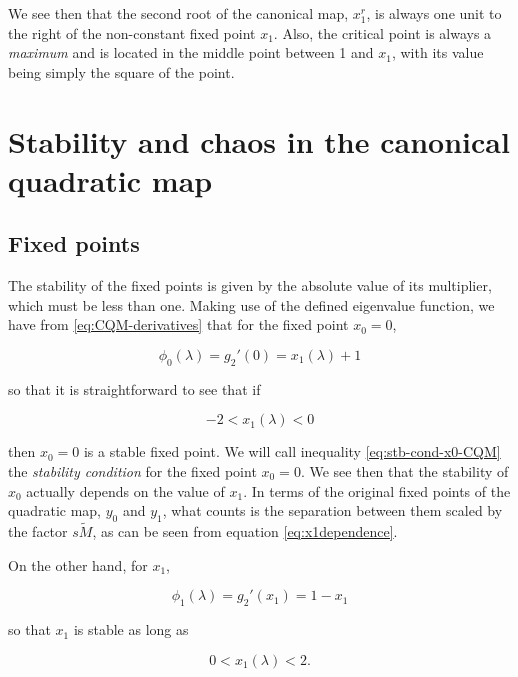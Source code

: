 \documentclass[10pt,twoside,titlepage]{book}
\numberwithin{equation}{chapter}
\numberwithin{figure}{chapter}
\numberwithin{table}{chapter}
\theoremstyle{plain}%
\theoremstyle{definition}
\theoremstyle{remark}
\begin{document}
We see then that the second root of the canonical map, $x_1^r$, is always one unit to the right of the non-constant fixed point $x_1$. Also, the critical point is always a \emph{maximum} and is located in the middle point between 1 and $x_1$, with its value being simply the square of the point.

\section{Stability and chaos in the canonical quadratic map}
\subsection{Fixed points}

The stability of the fixed points is given by the absolute value of its multiplier, which must be less than one. Making use of the defined eigenvalue function, we have from \eqref{eq:CQM-derivatives} that for the fixed point $x_0=0$,

\begin{equation}
	\label{eq:eigfun-x0-CQM}
	\phi_0(\lambda)=g_2'(0)=x_1(\lambda)+1
\end{equation}

so that it is straightforward to see that if

\begin{equation}
	\label{eq:stb-cond-x0-CQM}
	\tag{SC0}
	-2<x_1(\lambda)<0
\end{equation}

then $x_0=0$ is a stable fixed point. We will call inequality \ref{eq:stb-cond-x0-CQM} the \emph{stability condition} for the fixed point $x_0=0$. We see then that the stability of $x_0$ actually depends on the value of $x_1$. In terms of the original fixed points of the quadratic map, $y_0$ and $y_1$, what counts is the separation between them scaled by the factor $s\tilde{M}$, as can be seen from equation \eqref{eq:x1dependence}.

On the other hand, for $x_1$,

\begin{equation}
	\label{eq:eigfun-x1-CQM}
	\phi_1(\lambda)=g_2'(x_1)=1-x_1
\end{equation}

so that $x_1$ is stable as long as

\begin{equation}
	\label{eq:stb-cond-x1-CQM}
	\tag{SC1}
	0<x_1(\lambda)<2.
\end{equation}
\end{document}
